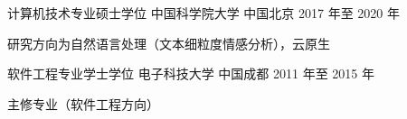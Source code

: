 

\begin{cventries}

  \cventry
    {计算机技术专业硕士学位} %
    {中国科学院大学} %
    {中国北京} %
    {2017 年至 2020 年} %
    {
      \begin{cvitems} %
        \item 研究方向为自然语言处理（文本细粒度情感分析），云原生
      \end{cvitems}
    }

  \cventry
    {软件工程专业学士学位} %
    {电子科技大学} %
    {中国成都} %
    {2011 年至 2015 年} %
    {
      \begin{cvitems} %
        \item 主修专业（软件工程方向）
      \end{cvitems}
    }

\end{cventries}
